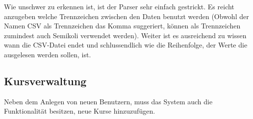 \documentclass[12pt, twoside, a4paper, ngerman]{article}
\begin{document}
Wie unschwer zu erkennen ist, ist der Parser sehr einfach gestrickt. Es reicht anzugeben welche Trennzeichen zwischen den Daten benutzt werden (Obwohl der Namen CSV als Trennzeichen das Komma suggeriert, können als Trennzeichen zumindest auch Semikoli verwendet werden).
Weiter ist es ausreichend zu wissen wann die CSV-Datei endet und schlussendlich wie die Reihenfolge, der Werte die ausgelesen werden sollen, ist.

	

\subsection{Kursverwaltung}

Neben dem Anlegen von neuen Benutzern, muss das System auch die Funktionalität besitzen, neue Kurse hinzuzufügen.

\end{document}
